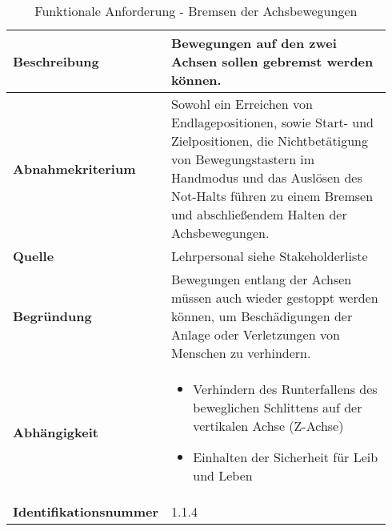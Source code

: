 \documentclass[../../../Bachelorarbeit.tex]{subfiles}
\begin{document}
\begin{table}[H]
    \centering
    \begin{tabular}{| p{0.34\linewidth} | p{0.6\linewidth} |}
        \hline
        \textbf{Beschreibung} & Bewegungen auf den zwei Achsen sollen gebremst werden können. \\ \hline
        \textbf{Abnahmekriterium} & Sowohl ein Erreichen von Endlagepositionen, sowie Start- und Zielpositionen, die Nichtbetätigung von Bewegungstastern im Handmodus und das Auslösen des Not-Halts führen zu einem Bremsen und abschließendem Halten der Achsbewegungen. \\ \hline
        \textbf{Quelle} & Lehrpersonal siehe Stakeholderliste \\ \hline
        \textbf{Begründung} & Bewegungen entlang der Achsen müssen auch wieder gestoppt werden können, um Beschädigungen der Anlage oder Verletzungen von Menschen zu verhindern. \\ \hline
        \textbf{Abhängigkeit} & {\begin{itemize}[noitemsep,topsep=0pt,parsep=0pt,partopsep=0pt,leftmargin=*]
            \item Verhindern des Runterfallens des beweglichen Schlittens auf der vertikalen Achse (Z-Achse)
            \item Einhalten der Sicherheit für Leib und Leben
        \end{itemize}} \\ \hline
        \textbf{Identifikationsnummer} & 1.1.4 \\ \hline
    \end{tabular}
    \caption[\acs{fa} - Bremsen der Achsbewegungen]{Funktionale Anforderung - Bremsen der Achsbewegungen}
    \label{tab:my-table4}
\end{table}
\end{document}
